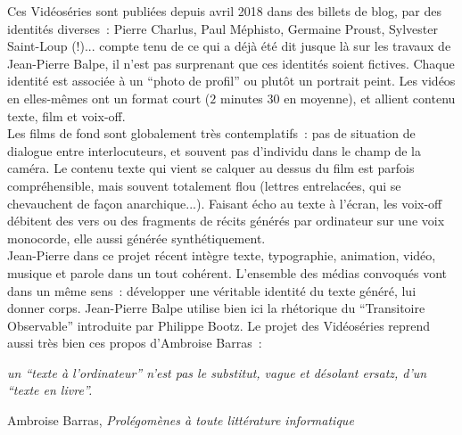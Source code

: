 \documentclass{article}
\newenvironment{citationbox}
{\begin{center}
		\begin{minipage}{.8\textwidth}
		}
		{
		\end{minipage}	
\end{center}
}
\begin{document}
				Ces  Vidéoséries sont publiées depuis avril 2018 dans des billets de blog, par des identités diverses : Pierre Charlus, Paul Méphisto, Germaine Proust, Sylvester Saint-Loup (!)... compte tenu de ce qui a déjà été dit jusque là sur les travaux de Jean-Pierre Balpe, il n'est pas surprenant que ces identités soient fictives.    Chaque identité est associée à un ``photo de profil'' ou plutôt un portrait peint. Les vidéos en elles-mêmes ont un format court ($2$ minutes $30$ en moyenne), et allient contenu texte, film et voix-off.\\
				
				Les films de fond sont globalement très contemplatifs : pas de situation de dialogue entre interlocuteurs, et souvent pas d'individu dans le champ de la caméra. Le contenu texte qui vient se calquer au dessus du film est parfois compréhensible, mais souvent totalement flou (lettres entrelacées, qui se chevauchent de façon anarchique...). Faisant écho au texte à l'écran, les voix-off débitent des vers ou des fragments de récits générés par ordinateur sur une voix monocorde, elle aussi générée synthétiquement.\\
				
				Jean-Pierre dans ce projet récent intègre texte, typographie, animation, vidéo, musique et parole dans un tout cohérent. L'ensemble des médias convoqués vont dans un même sens~: développer une véritable identité du texte généré, lui donner corps. Jean-Pierre Balpe utilise bien ici la rhétorique du ``Transitoire Observable'' introduite par Philippe Bootz. Le projet des Vidéoséries reprend aussi très bien ces propos d'Ambroise Barras~:
				\begin{citationbox}
					\textit{un ``texte à
						l'ordinateur'' n'est pas le substitut, vague et désolant ersatz, d'un ``texte en
						livre''.}
					\begin{flushright}
						Ambroise Barras, \textit{Prolégomènes à toute littérature informatique} \cite{barras1995}
					\end{flushright}
				\end{citationbox}
				
\end{document}
